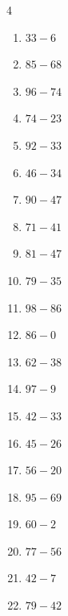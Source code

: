 \begin{multicols}{4}
\begin{enumerate}
  \item $33-6$
        \phantom{$=27$}

  \item $85-68$
        \phantom{$=17$}

  \item $96-74$
        \phantom{$=22$}

  \item $74-23$
        \phantom{$=51$}

  \item $92-33$
        \phantom{$=59$}

  \item $46-34$
        \phantom{$=12$}

  \item $90-47$
        \phantom{$=43$}

  \item $71-41$
        \phantom{$=30$}

  \item $81-47$
        \phantom{$=34$}

  \item $79-35$
        \phantom{$=44$}

  \item $98-86$
        \phantom{$=12$}

  \item $86-0$
        \phantom{$=86$}

  \item $62-38$
        \phantom{$=24$}

  \item $97-9$
        \phantom{$=88$}

  \item $42-33$
        \phantom{$=9$}

  \item $45-26$
        \phantom{$=19$}

  \item $56-20$
        \phantom{$=36$}

  \item $95-69$
        \phantom{$=26$}

  \item $60-2$
        \phantom{$=58$}

\columnbreak %

  \item $77-56$
        \phantom{$=21$}

  \item $42-7$
        \phantom{$=35$}

  \item $79-42$
        \phantom{$=37$}


\end{enumerate}
\end{multicols}
